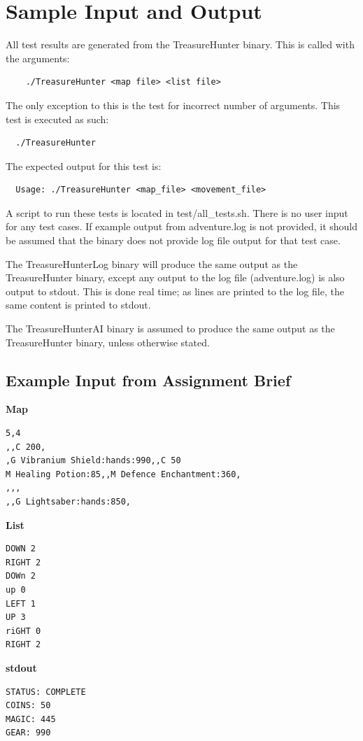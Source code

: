 \documentclass{article}
\begin{document}
\section{Sample Input and Output}
All test results are generated from the TreasureHunter binary.
This is called with the arguments:
\begin{lstlisting}
    ./TreasureHunter <map file> <list file>
\end{lstlisting}
The only exception to this is the test for incorrect number of arguments.
This test is executed as such:
\begin{lstlisting}
  ./TreasureHunter
\end{lstlisting}

The expected output for this test is:
\begin{lstlisting}
  Usage: ./TreasureHunter <map_file> <movement_file>
\end{lstlisting}

A script to run these tests is located in test/all\_tests.sh.
There is no user input for any test cases.
If example output from adventure.log is not provided, it should be assumed that the binary
does not provide log file output for that test case.

The TreasureHunterLog binary will produce the same output as the TreasureHunter binary,
except any output to the log file (adventure.log) is also output to stdout. This is done
real time; as lines are printed to the log file, the same content is printed to stdout.

The TreasureHunterAI binary is assumed to produce the same output as the TreasureHunter binary,
unless otherwise stated.

\subsection{Example Input from Assignment Brief}
\quad \textbf{Map}
\begin{lstlisting}
5,4
,,C 200,
,G Vibranium Shield:hands:990,,C 50
M Healing Potion:85,,M Defence Enchantment:360,
,,,
,,G Lightsaber:hands:850,
\end{lstlisting}

\textbf{List}
\begin{lstlisting}
DOWN 2
RIGHT 2
DOWn 2
up 0
LEFT 1
UP 3
riGHT 0
RIGHT 2
\end{lstlisting}
\pagebreak

\textbf{stdout}
\begin{lstlisting}
STATUS: COMPLETE
COINS: 50
MAGIC: 445
GEAR: 990
\end{lstlisting}
\end{document}
